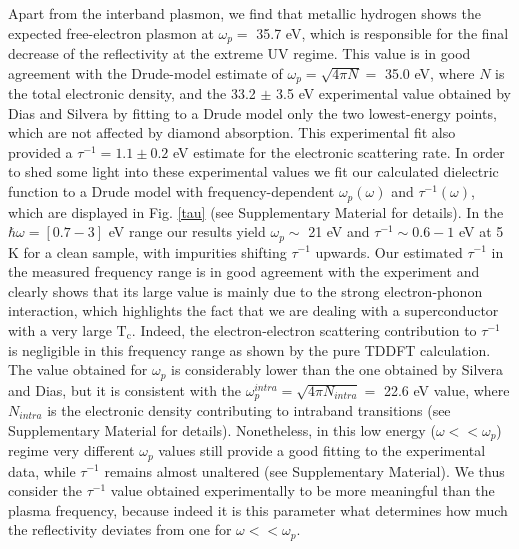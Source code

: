\documentclass[%
 reprint,
superscriptaddress,
 amsmath,amssymb,
 aps,
prb,
floatfix,
]{revtex4-1}
\begin{document}
Apart from the interband plasmon, we find that metallic hydrogen
shows the expected free-electron plasmon at $\omega_p=$ 35.7 eV,
which is responsible for the final decrease of the reflectivity 
at the extreme UV regime. This value is in good agreement 
with the Drude-model estimate of 
$\omega_p = \sqrt{4\pi N}=$ 35.0 eV,
where $N$ is the total electronic density,
and the 33.2 $\pm$ 3.5 eV
experimental value obtained by Dias and Silvera by
fitting to a Drude model only the two lowest-energy points,
which are not affected 
by diamond absorption\cite{Dias2017}. 
This experimental fit also provided a 
$\tau^{-1} = 1.1 \pm 0.2$ eV estimate for the electronic scattering rate\cite{Dias2017}. 
In order to shed some light into these experimental values 
we fit our calculated dielectric function to a Drude model
with frequency-dependent $\omega_p(\omega)$ and $\tau^{-1}(\omega)$, which are displayed in Fig. \ref{tau} 
(see Supplementary Material for details). 
In the $\hbar\omega= [0.7-3]$ eV range our results
yield $\omega_p\sim$ 21 eV and $\tau^{-1}\sim 0.6-1$ eV at 5 K for 
a clean sample, with impurities shifting $\tau^{-1}$ upwards.
Our estimated $\tau^{-1}$ in the measured frequency range is in good agreement
with the experiment and clearly shows that its large value  
is mainly due to the strong electron-phonon interaction, which highlights the fact that we are dealing with a superconductor
with a very large $\mathrm{T_c}$.  
Indeed, the electron-electron scattering contribution to $\tau^{-1}$
is negligible in this frequency range as shown by the pure 
TDDFT calculation. 
The value obtained for $\omega_p$ is considerably lower than the 
one obtained by Silvera and Dias\cite{Diaseaal1579,Dias2017}, but it is consistent
with the $\omega_{p}^{intra}=\sqrt{4 \pi N_{intra}}=$ 22.6 eV
value, where $N_{intra}$ is the electronic density contributing to intraband 
transitions (see Supplementary Material for details).
Nonetheless, in this low energy
($\omega<<\omega_p$) regime very different $\omega_p$ values still provide 
a good fitting to the experimental data, while $\tau^{-1}$ remains almost unaltered
(see Supplementary Material). 
We thus consider the $\tau^{-1}$ value 
obtained experimentally\cite{Diaseaal1579,Dias2017} to be more meaningful
than the plasma frequency, because indeed it is this parameter what determines
how much the reflectivity deviates from one for $\omega << \omega_p$. 

\end{document}
